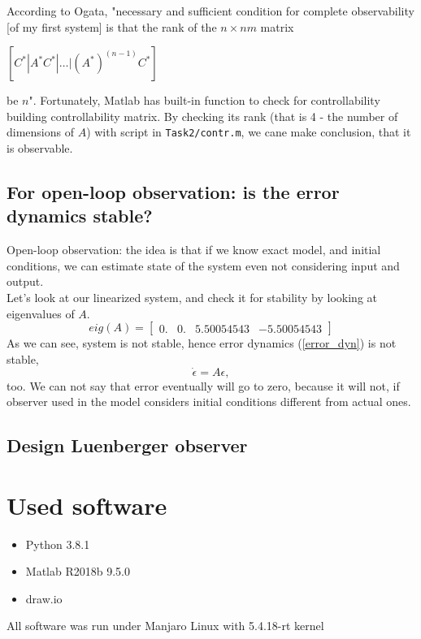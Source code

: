 \documentclass[a4paper,12pt]{article}
\begin{document}
According to Ogata, "necessary and sufficient condition for complete observability [of my first system]
is that the rank of the $n\times nm$ matrix 
\begin{center}
    $[C^* | A^*C^* | \dots | (A^*)^{(n-1)}C^*]$
\end{center}
be $n$". Fortunately, Matlab has built-in function to check for controllability 
building controllability matrix. By checking its rank (that is 4 - the number of 
dimensions of $A$) with script in \texttt{Task2/contr.m}, we cane make conclusion,
that it is observable.

\subsection{For open-loop observation: is the error dynamics stable?}
Open-loop observation: the idea is that if we know exact model, and initial 
conditions, we can estimate state of the system even not considering input and 
output.\\
Let's look at our linearized system, and check it for stability by looking at 
eigenvalues of $A$.
\begin{equation*}
    eig(A) = 
    \begin{bmatrix}
        0. & 0. & 5.50054543 & -5.50054543
    \end{bmatrix}
\end{equation*}  
As we can see, system is not stable, hence error dynamics (\ref{error_dyn}) is not 
stable,
\begin{equation} \label{error_dyn}
    \dot \epsilon = A\epsilon,
\end{equation} 
too. We can not say that error eventually will go to zero, because it 
will not, if observer used in the model considers initial conditions different 
from actual ones.
\subsection{Design Luenberger observer}

\section{Used software}
\begin{itemize}
    \item Python 3.8.1
    \item Matlab R2018b 9.5.0
    \item draw.io
\end{itemize}
All software was run under Manjaro Linux with 5.4.18-rt kernel
\end{document}
